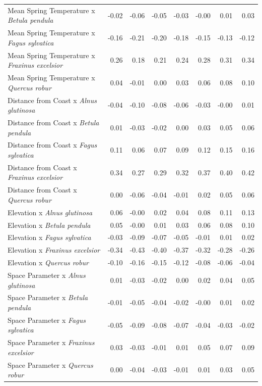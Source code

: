 \documentclass{article}\usepackage[]{graphicx}\usepackage[]{color}
\begin{document}
\begin{longtable}{lrrrrrrr}
  Mean Spring 
Temperature
x\textit{ Betula pendula} & -0.02 & -0.06 & -0.05 & -0.03 & -0.00 & 0.01 & 0.03 \\ 
  Mean Spring 
Temperature
x\textit{ Fagus sylvatica} & -0.16 & -0.21 & -0.20 & -0.18 & -0.15 & -0.13 & -0.12 \\ 
  Mean Spring 
Temperature
x\textit{ Fraxinus excelsior} & 0.26 & 0.18 & 0.21 & 0.24 & 0.28 & 0.31 & 0.34 \\ 
  Mean Spring 
Temperature
x\textit{ Quercus robur} & 0.04 & -0.01 & 0.00 & 0.03 & 0.06 & 0.08 & 0.10 \\ 
  Distance from 
Coast
x\textit{ Alnus glutinosa} & -0.04 & -0.10 & -0.08 & -0.06 & -0.03 & -0.00 & 0.01 \\ 
  Distance from 
Coast
x\textit{ Betula pendula} & 0.01 & -0.03 & -0.02 & 0.00 & 0.03 & 0.05 & 0.06 \\ 
  Distance from 
Coast
x\textit{ Fagus sylvatica} & 0.11 & 0.06 & 0.07 & 0.09 & 0.12 & 0.15 & 0.16 \\ 
  Distance from 
Coast
x\textit{ Fraxinus excelsior} & 0.34 & 0.27 & 0.29 & 0.32 & 0.37 & 0.40 & 0.42 \\ 
  Distance from 
Coast
x\textit{ Quercus robur} & 0.00 & -0.06 & -0.04 & -0.01 & 0.02 & 0.05 & 0.06 \\ 
  Elevation
x\textit{ Alnus glutinosa} & 0.06 & -0.00 & 0.02 & 0.04 & 0.08 & 0.11 & 0.13 \\ 
  Elevation
x\textit{ Betula pendula} & 0.05 & -0.00 & 0.01 & 0.03 & 0.06 & 0.08 & 0.10 \\ 
  Elevation
x\textit{ Fagus sylvatica} & -0.03 & -0.09 & -0.07 & -0.05 & -0.01 & 0.01 & 0.02 \\ 
  Elevation
x\textit{ Fraxinus excelsior} & -0.34 & -0.43 & -0.40 & -0.37 & -0.32 & -0.28 & -0.26 \\ 
  Elevation
x\textit{ Quercus robur} & -0.10 & -0.16 & -0.15 & -0.12 & -0.08 & -0.06 & -0.04 \\ 
  Space Parameter
x\textit{ Alnus glutinosa} & 0.01 & -0.03 & -0.02 & 0.00 & 0.02 & 0.04 & 0.05 \\ 
  Space Parameter
x\textit{ Betula pendula} & -0.01 & -0.05 & -0.04 & -0.02 & -0.00 & 0.01 & 0.02 \\ 
  Space Parameter
x\textit{ Fagus sylvatica} & -0.05 & -0.09 & -0.08 & -0.07 & -0.04 & -0.03 & -0.02 \\ 
  Space Parameter
x\textit{ Fraxinus excelsior} & 0.03 & -0.03 & -0.01 & 0.01 & 0.05 & 0.07 & 0.09 \\ 
  Space Parameter
x\textit{ Quercus robur} & 0.00 & -0.04 & -0.03 & -0.01 & 0.01 & 0.03 & 0.05 \\ 

\end{longtable}
\end{document}

